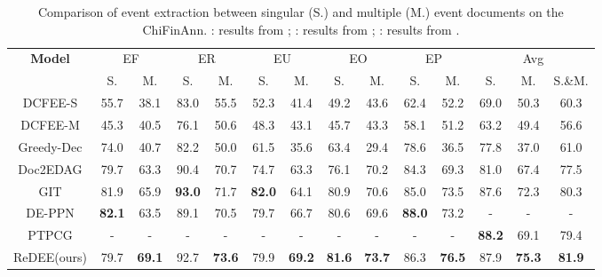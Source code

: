 \documentclass[11pt]{article}
\begin{document}
\begin{table*}
\centering\small
\begin{tabular}{c|cc|cc|cc|cc|cc|ccc}
\hline
\hline
\textbf{Model} & \multicolumn{2}{c|}{EF} & \multicolumn{2}{c|}{ER} & \multicolumn{2}{c|}{EU} & \multicolumn{2}{c|}{EO} & \multicolumn{2}{c|}{EP} & \multicolumn{3}{c}{Avg} \\ 
& S. & M.
& S. & M.
& S. & M.
& S. & M.
& S. & M.
& S. & M. & S.\&M. \\
\hline
DCFEE-S & 55.7 & 38.1 & 83.0 & 55.5 & 52.3 & 41.4 & 49.2 & 43.6 & 62.4 & 52.2 & 69.0 & 50.3 & 60.3 \\
DCFEE-M & 45.3 & 40.5 & 76.1 & 50.6 & 48.3 & 43.1 & 45.7 & 43.3 & 58.1 & 51.2 & 63.2 & 49.4 & 56.6 \\
Greedy-Dec & 74.0 & 40.7 & 82.2 & 50.0 & 61.5 & 35.6 & 63.4 & 29.4 & 78.6 & 36.5 & 77.8 & 37.0 & 61.0 \\
Doc2EDAG & 79.7 & 63.3 & 90.4 & 70.7 & 74.7 & 63.3 & 76.1 & 70.2 & 84.3 & 69.3 & 81.0 & 67.4 & 77.5 \\
GIT & 81.9 & 65.9 & \textbf{93.0} & 71.7 & \textbf{82.0} & 64.1 & 80.9 & 70.6 & 85.0 & 73.5 & 87.6 & 72.3 & 80.3 \\
DE-PPN & \textbf{82.1} & 63.5 & 89.1 & 70.5 & 79.7 & 66.7 & 80.6 & 69.6 & \textbf{88.0} & 73.2 & - & - & - \\
      
PTPCG & - & - & - & - & - & - & - & - & - & - & \textbf{88.2} & 69.1 & 79.4 \\
\hline
ReDEE(ours) & 79.7 & \textbf{69.1} & 92.7 & \textbf{73.6} & 79.9 & \textbf{69.2} & \textbf{81.6} & \textbf{73.7} & 86.3 & \textbf{76.5} & 87.9 & \textbf{75.3} & \textbf{81.9} \\
\hline
\hline
\end{tabular}
\caption{Comparison of event extraction between singular (S.) and multiple (M.) event documents on the ChiFinAnn. : results from \cite{GIT}; : results from  \cite{DE-PPN}; : results from  \cite{PTPCG}.}
\label{tab:multi-event}
\end{table*}

\begin{table}
\centering\small
{}
\caption{Ablation studies on ReDEE variants for RAAT.}
\label{tab:ablation1}
\end{table}
\end{document}
